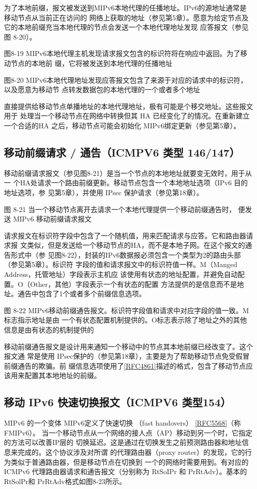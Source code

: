 为了本地前缀，报文被发送到MIPv6本地代理的任播地址。IPv6的源地址通常是移动节点从当前正在访问的
网络上获取的地址（参见第5章）。愿意为给定节点及它的本地前缀充当本地代理的节点会发送一个本地代理地址发现
应答报文（参见图 8-20）。

图8-19 MIPv6本地代理主机发现请求报文包含的标识符将在响应中返回。为了移动节点的本地前
缀，它将被发送到本地代理的任播地址

图8-20 MIPv6本地代理地址发现应答报文包含了来源于对应的请求中的标识符，以及愿意为移动节
点转发数据包的本地代理的一个或者多个地址

直接提供给移动节点单播地址的本地代理地址，极有可能是个移交地址。这些报文用于
处理当一个移动节点在网络中转换但其 HA 已经变化了的情况。在重新建立一个合适的HA
之后，移动节点可能会初始化 MIPv6绑定更新（参见第5章）。

\subsection{移动前缀请求 / 通告（ICMPV6 类型 146/147）}
移动前缀请求报文（参见图8-21）是当一个节点的本地地址就要变无效时，用于从一
个HA处请求一个路由前缀更新。移动节点包含一个本地地址选项（IPv6 目的地址选项，参
见第5章），并使用 IPsec 保护请求（参见第18章）。

图 8-21 当一个移动节点离开去请求一个本地代理提供一个移动前缀通告时，
便发送 MIPv6 移动前缀请求报文

请求报文在标识符字段中包含了一个随机值，用来匹配请求与应答。它和路由器请求报
文类似，但是发送给一个移动节点的HA，而不是本地子网。在这个报文的通告形式中（参
见图8-22），封装的IPv6数据报必须包含一个类型为2的路由头部（参见第5章）。标识符
字段的值和请求报文中的标识符值一样。M（Manged Address，托管地址）字段表示主机应
该使用有状态的地址配置，并避免自动配置。O（Other，其他）字段表示一个有状态的配置
方法提供的是信息而不是地址。通告中包含了1个或者多个前缀信息选项。

图 8-22 MIPv6移动前缀通告报文。标识符字段值和请求中对应字段的值一致。M标志指示地址是由
一个有状态配置机制提供的。O标志表示除了地址之外的其他信息是由有状态的机制提供的

移动前缀通告报文是设计用来通知一个移动中的节点其本地前缀已经改变了。这个报文通
常是使用 IPsec保护的（参见第18章），主要是为了帮助移动节点免受假冒前缀通告的欺骗。前
缀信息选项使用了\href{https://www.rfc-editor.org/rfc/rfc4861}{[RFC4861]}描述的格式，包含了移动节点应该用来配置其本地地址的前缀。
\subsection{移动 IPv6 快速切换报文（ICMPV6 类型154）}
MIPv6 的一个变体 MIPv6定义了快速切换 （fast handovers） \href{https://www.rfc-editor.org/rfc/rfc5568}{[RFC5568]}（称 FMIPv6）。
当一个移动节点从一个网络的接人点（AP）移动到另一个时，它指定的方法可以改善IP层的
切换延迟。这是通过在切换发生之前预测路由器和地址信息来完成的。这个协议涉及对所谓
的代理路由器（proxy router）的发现，它的行为类似于普通路由器，但是移动节点在切换到
一个的网络时需要用到。有对应的ICMPv6 代理路由器请求和通告报文（分别称为 RtSoIPr
和 PrRtAdv）。基本的RtSolPr和 PrRtAdv格式如图8-23所示。

